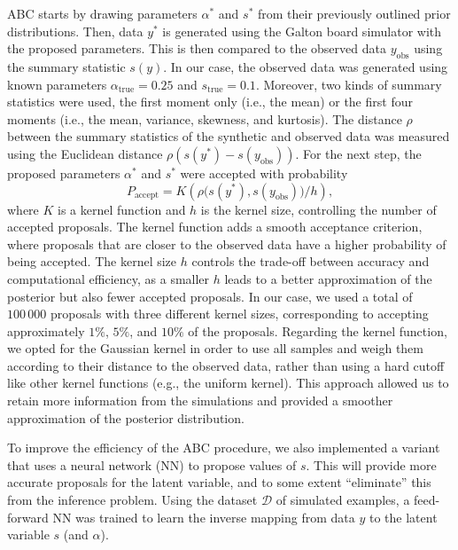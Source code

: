 \documentclass[a4paper, 12pt]{article}
\begin{document}
ABC starts by drawing parameters $\alpha^\ast$ and $s^\ast$ from their previously outlined prior distributions. Then, data $y^\ast$ is generated using the Galton board simulator with the proposed parameters. This is then compared to the observed data $y_{\text{obs}}$ using the summary statistic $s(y)$. In our case, the observed data was generated using known parameters $\alpha_{\text{true}} = 0.25$ and $s_{\text{true}} = 0.1$. Moreover, two kinds of summary statistics were used, the first moment only (i.e., the mean) or the first four moments (i.e., the mean, variance, skewness, and kurtosis). The distance $\rho$ between the summary statistics of the synthetic and observed data was measured using the Euclidean distance $\rho(s(y^\ast) - s(y_{\text{obs}}))$. For the next step, the proposed parameters $\alpha^\ast$ and $s^\ast$ were accepted with probability
\begin{equation}
    P_{\text{accept}} = K(\rho\big(s(y^\ast), s(y_{\text{obs}})\big) / h),
\end{equation}
where $K$ is a kernel function and $h$ is the kernel size, controlling the number of accepted proposals. The kernel function adds a smooth acceptance criterion, where proposals that are closer to the observed data have a higher probability of being accepted. The kernel size $h$ controls the trade-off between accuracy and computational efficiency, as a smaller $h$ leads to a better approximation of the posterior but also fewer accepted proposals. In our case, we used a total of $100\,000$ proposals with three different kernel sizes, corresponding to accepting approximately $1\%$, $5\%$, and $10\%$ of the proposals. Regarding the kernel function, we opted for the Gaussian kernel in order to use all samples and weigh them according to their distance to the observed data, rather than using a hard cutoff like other kernel functions (e.g., the uniform kernel). This approach allowed us to retain more information from the simulations and provided a smoother approximation of the posterior distribution.

To improve the efficiency of the ABC procedure, we also implemented a variant that uses a neural network (NN) to propose values of $s$. This will provide more accurate proposals for the latent variable, and to some extent ``eliminate'' this from the inference problem. Using the dataset $\mathcal{D}$ of simulated examples, a feed-forward NN was trained to learn the inverse mapping from data $y$ to the latent variable $s$ (and $\alpha$). 
\end{document}
